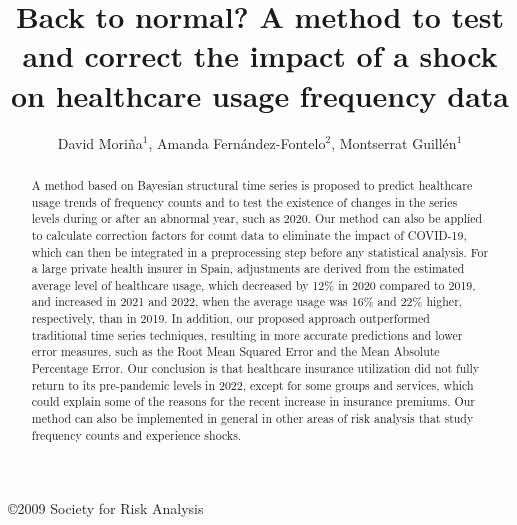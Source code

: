 \documentclass[]{risa}
\begin{document}
\jvol{}
\jnum{}
\pubyear{}

\doi{}
\copyright{2009 Society for Risk Analysis}
\issnyear{}

\title[Back to normal?]{Back to normal? A method to test and correct the impact of a shock on healthcare usage frequency data}

\author[David Mori\~na et al.]{David Mori\~na$^{1}$,
Amanda Fern\'andez-Fontelo$^{2}$,
Montserrat Guill\'en$^{1}$
} 

\begin{abstract}
A method based on Bayesian structural time series is proposed to predict healthcare usage trends of frequency counts and to test the existence of changes in the series levels during or after an abnormal year, such as 2020. Our method can also be applied to calculate correction factors for count data to eliminate the impact of COVID-19, which can then be integrated in a preprocessing step before any statistical analysis. For a large private health insurer in Spain, adjustments are derived from the estimated average level of healthcare usage, which decreased by 12\% in 2020 compared to 2019, and increased in 2021 and 2022, when the average usage was 16\% and 22\% higher, respectively, than in 2019. In addition, our proposed approach outperformed traditional time series techniques, resulting in more accurate predictions and lower error measures, such as the Root Mean Squared Error and the Mean Absolute Percentage Error. Our conclusion is that healthcare insurance utilization did not fully return to its pre-pandemic levels in 2022, except for some groups and services, which could explain some of the reasons for the recent increase in insurance premiums. Our method can also be implemented in general in other areas of risk analysis that study frequency counts and experience shocks.


\end{abstract}
\end{document}

